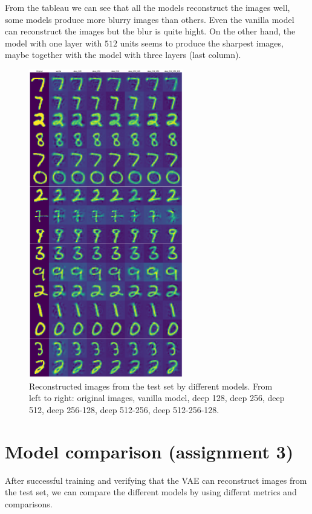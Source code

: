 \documentclass[a4paper,11pt]{article}
\begin{document}
From the tableau we can see that all the models reconstruct the images well, some models produce more blurry images than others.
Even the vanilla model can reconstruct the images but the blur is quite hight.
On the other hand, the model with one layer with $512$ units seems to produce the sharpest images, maybe together with the model with three layers (last column).

\begin{figure}[ht]
    \centering
    \includegraphics[width=0.6\textwidth]{../images/reconstructions.png}
    \caption{Reconstructed images from the test set by different models. From left to right: original images, vanilla model, deep 128, deep 256, deep 512, deep 256-128, deep 512-256, deep 512-256-128.}
    \label{fig:reconstructions}
\end{figure}

\clearpage

\section*{Model comparison (assignment 3)}
After successful training and verifying that the VAE can reconstruct images from the test set, we can compare the different models by using differnt metrics and comparisons.
\end{document}
